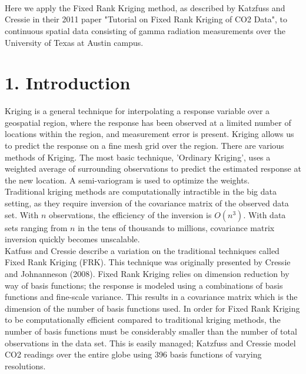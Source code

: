 \documentclass[11pt]{article}
\title{
\vspace{2in}
\textmd{\textbf{\hmwkTitle}}\\
\normalsize\vspace{0.1in}\small{\hmwkDueDate}\\
\vspace{0.1in}\large{\textit{\hmwkClassInstructor\ }}
\vspace{3in}
}
\author{\textbf{\hmwkAuthorName}}
\date{} %
\begin{document}
\maketitle



\newpage

Here we apply the Fixed Rank Kriging method, as described by Katzfuss and Cressie in their 2011 paper "Tutorial on Fixed Rank Kriging of CO2 Data", to continuous spatial data consisting of gamma radiation measurements over the University of Texas at Austin campus.  

\section{1. Introduction}

Kriging is a general technique for interpolating a response variable over a geospatial region, where the response has been observed at a limited number of locations within the region, and measurement error is present.  Kriging allows us to predict the response on a fine mesh grid over the region. There are various methods of Kriging.  The most basic technique, 'Ordinary Kriging', uses a weighted average of surrounding observations to predict the estimated response at the new location.  A semi-variogram is used to optimize the weights.  \\

Traditional kriging methods are computationally intractible in the big data setting, as they  require inversion of the covariance matrix of the observed data set.  With $n$ observations, the efficiency of the inversion is $O(n^3)$.  With data sets ranging from $n$ in the tens of thousands to millions, covariance matrix inversion quickly becomes unscalable. \\

Katfuss and Cressie describe a variation on the traditional techniques called Fixed Rank Kriging (FRK).  This technique was originally presented by Cressie and Johnanneson (2008).  Fixed Rank Kriging relies on dimension reduction by way of basis functions; the response is modeled using a combinations of basis functions and fine-scale variance.  This results in a covariance matrix which is the dimension of the number of basis functions used.  In order for Fixed Rank Kriging to be computationally efficient compared to traditional kriging methods, the number of basis functions must be considerably smaller than the number of total observations in the data set.  This is easily managed; Katzfuss and Cressie model CO2 readings over the entire globe using 396 basis functions of varying resolutions.  \\
\end{document}
